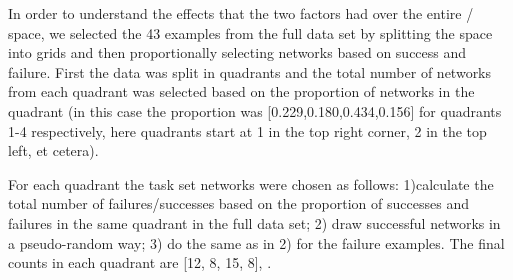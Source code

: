 In order to understand the effects that the two \famsec{} factors had over the entire \xQ{}/\xO{} space, we selected the 43 examples from the full data set by splitting the space into grids and then proportionally selecting networks based on success and failure. First the data was split in quadrants and the total number of networks from each quadrant was selected based on the proportion of networks in the quadrant (in this case the proportion was [0.229,0.180,0.434,0.156] for quadrants 1-4 respectively, here quadrants start at 1 in the top right corner, 2 in the top left, et cetera).

For each quadrant the task set networks were chosen as follows: 1)calculate the total number of failures/successes based on the proportion of successes and failures in the same quadrant in the full data set; 2) draw successful networks in a pseudo-random way; 3) do the same as in 2) for the failure examples. The final counts in each quadrant are [12, 8, 15, 8], .


